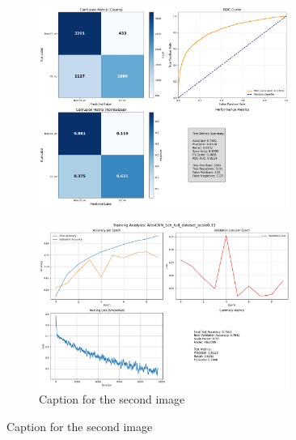 \documentclass{pracalicmgr}
\begin{document}
\begin{figure}[H]
    \centering
    \begin{subfigure}{\textwidth}
        \centering
        \includegraphics[width=0.9\textwidth]{src/AlexCNN_1ch_full_dataset_scale033.png}
        \label{fig:full33sub1}
    \end{subfigure}
    
    \vspace{1cm}
    
    \begin{subfigure}{\textwidth}
        \centering
        \includegraphics[width=0.9\textwidth]{src/AlexCNN_1ch_full_dataset_scale0.33loss.png}
        \caption{Caption for the second image}
        \label{fig:full33sub2}
    \end{subfigure}
    \label{fig:full33stacked}
\end{figure}
\end{document}
